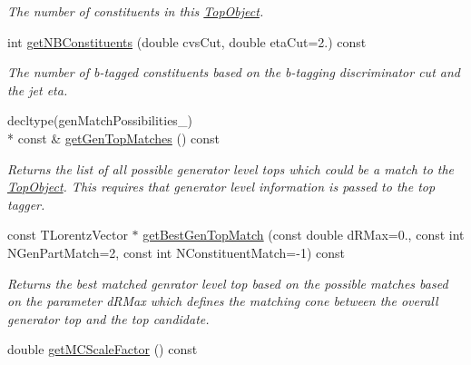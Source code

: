 \begin{DoxyCompactItemize}
\begin{DoxyCompactList}\small\item\em The number of constituents in this \hyperlink{classTopObject}{Top\-Object}. \end{DoxyCompactList}\item 
\hypertarget{classTopObject_a2b5bb6b014c80262b748171698ba1042}{int \hyperlink{classTopObject_a2b5bb6b014c80262b748171698ba1042}{get\-N\-B\-Constituents} (double cvs\-Cut, double eta\-Cut=2.) const }\label{classTopObject_a2b5bb6b014c80262b748171698ba1042}

\begin{DoxyCompactList}\small\item\em The number of b-\/tagged constituents based on the b-\/tagging discriminator cut and the jet eta. \end{DoxyCompactList}\item 
\hypertarget{classTopObject_a51cc6fbaacb2cf502cad0b57d99ae91f}{decltype(gen\-Match\-Possibilities\-\_\-) \\*
const \& \hyperlink{classTopObject_a51cc6fbaacb2cf502cad0b57d99ae91f}{get\-Gen\-Top\-Matches} () const }\label{classTopObject_a51cc6fbaacb2cf502cad0b57d99ae91f}

\begin{DoxyCompactList}\small\item\em Returns the list of all possible generator level tops which could be a match to the \hyperlink{classTopObject}{Top\-Object}. This requires that generator level information is passed to the top tagger. \end{DoxyCompactList}\item 
\hypertarget{classTopObject_a0a8891d8e9a4cd4b77cb6063c48eb7c6}{const T\-Lorentz\-Vector $\ast$ \hyperlink{classTopObject_a0a8891d8e9a4cd4b77cb6063c48eb7c6}{get\-Best\-Gen\-Top\-Match} (const double d\-R\-Max=0., const int N\-Gen\-Part\-Match=2, const int N\-Constituent\-Match=-\/1) const }\label{classTopObject_a0a8891d8e9a4cd4b77cb6063c48eb7c6}

\begin{DoxyCompactList}\small\item\em Returns the best matched genrator level top based on the possible matches based on the parameter d\-R\-Max which defines the matching cone between the overall generator top and the top candidate. \end{DoxyCompactList}\item 
\hypertarget{classTopObject_a77edcc1258a253b60747eb557c12dd52}{double \hyperlink{classTopObject_a77edcc1258a253b60747eb557c12dd52}{get\-M\-C\-Scale\-Factor} () const }\label{classTopObject_a77edcc1258a253b60747eb557c12dd52}


\end{DoxyCompactItemize}
